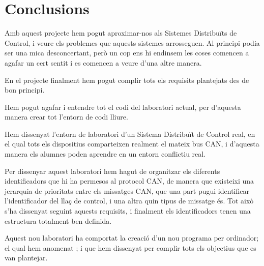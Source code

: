 

\chapter{Conclusions}\label{cap:conc} %



\ifpdf
    \graphicspath{{8_conclusions/figures/PNG/}{8_conclusions/figures/PDF/}{8_conclusions/figures/}}
\else
    \graphicspath{{8_conclusions/figures/EPS/}{8_conclusions/figures/}}
\fi


Amb aquest projecte hem pogut aproximar-nos als Sistemes Distribuïts de Control, i veure els problemes que aquests sistemes arrosseguen. Al principi podia ser una mica desconcertant, però un cop ens hi endinsem les coses comencen a agafar un cert sentit i es comencen a veure d'una altre manera.

En el projecte finalment hem pogut complir tots els requisits plantejats des de bon principi.

Hem pogut agafar i entendre tot el codi del laboratori actual, per d'aquesta manera crear tot l'entorn de codi lliure.

Hem dissenyat l'entorn de laboratori d'un Sistema Distribuït de Control real, en el qual tots els dispositius comparteixen realment el mateix bus CAN, i d'aquesta manera els alumnes poden aprendre en un entorn conflictiu real. 

Per dissenyar aquest laboratori hem hagut de organitzar els diferents identificadors que hi ha permesos al protocol CAN, de manera que existeixi una jerarquia de prioritats entre els missatges CAN, que una part pugui identificar l'identificador del llaç de control, i una altra quin tipus de missatge és. Tot això s'ha dissenyat seguint aquests requisits, i finalment els identificadors tenen una estructura totalment ben definida.

Aquest nou laboratori ha comportat la creació d'un nou programa per ordinador; el qual hem anomenat \DCSMonitor; i que hem dissenyat per complir tots els objectius que es van plantejar. 

